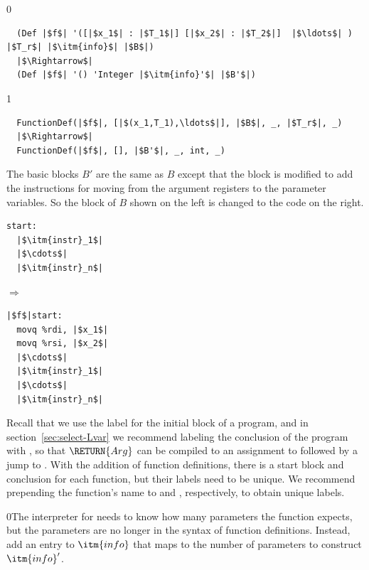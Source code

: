 \documentclass[7x10]{TimesAPriori_MIT}%
\def\racketEd{0}
\def\pythonEd{1}
\def\edition{0}
\newcommand{\racket}[1]{{\if\edition\racketEd{#1}\fi}}
\numberwithin{theorem}{chapter}
\numberwithin{definition}{chapter}
\numberwithin{equation}{chapter}
\begin{document}
{\if\edition\racketEd
\begin{lstlisting}
  (Def |$f$| '([|$x_1$| : |$T_1$|] [|$x_2$| : |$T_2$|]  |$\ldots$| ) |$T_r$| |$\itm{info}$| |$B$|)
  |$\Rightarrow$|
  (Def |$f$| '() 'Integer |$\itm{info}'$| |$B'$|)
\end{lstlisting}
\fi}
{\if\edition\pythonEd
\begin{lstlisting}
  FunctionDef(|$f$|, [|$(x_1,T_1),\ldots$|], |$B$|, _, |$T_r$|, _)
  |$\Rightarrow$|
  FunctionDef(|$f$|, [], |$B'$|, _, int, _)
\end{lstlisting}
\fi}
The basic blocks $B'$ are the same as $B$ except that the
 block is modified to add the instructions for moving from
the argument registers to the parameter variables. So the 
block of $B$ shown on the left is changed to the code on the right.
\begin{center}
\begin{minipage}{0.3\textwidth}
\begin{lstlisting}
start:
  |$\itm{instr}_1$|
  |$\cdots$|
  |$\itm{instr}_n$|
\end{lstlisting}
\end{minipage}
$\Rightarrow$
\begin{minipage}{0.3\textwidth}
\begin{lstlisting}
|$f$|start:
  movq %rdi, |$x_1$|
  movq %rsi, |$x_2$|
  |$\cdots$|
  |$\itm{instr}_1$|
  |$\cdots$|
  |$\itm{instr}_n$|
\end{lstlisting}
\end{minipage}
\end{center}
Recall that we use the label  for the initial block of a
program, and in section~\ref{sec:select-Lvar} we recommend labeling
the conclusion of the program with , so that
$\RETURN{Arg}$ can be compiled to an assignment to  followed
by a jump to . With the addition of function
definitions, there is a start block and conclusion for each function,
but their labels need to be unique. We recommend prepending the
function's name to  and , respectively,
to obtain unique labels.

\racket{The interpreter for \LangXIndCall{} needs to know how many
  parameters the function expects, but the parameters are no longer in
  the syntax of function definitions. Instead, add an entry to
  $\itm{info}$ that maps \code{num-params} to the number of parameters
  to construct $\itm{info}'$.}
\end{document}
